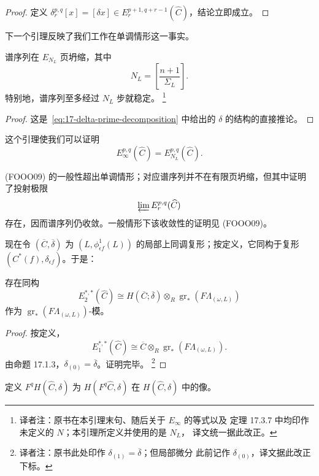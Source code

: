 \begin{proof}
定义 $\delta_r^{p,q}[x]=[\delta x]\in E_r^{p+1,q+r-1}(\widehat C)$，结论立即成立。
\end{proof}

下一个引理反映了我们工作在单调情形这一事实。

\begin{lemma}
\label{lem:spectral-sequence-collapse}
谱序列在 $E_{N_L}$ 页坍缩，其中
\[
 N_L=\left[\frac{n+1}{\Sigma_L}\right].
\]
特别地，谱序列至多经过 $N_L$ 步就稳定。
\footnote{译者注：原书在本引理末句、随后关于 $E_\infty$ 的等式以及
定理 17.3.7 中均印作未定义的 $N$；本引理所定义并使用的是 $N_L$，
译文统一据此改正。}
\end{lemma}

\begin{proof}
这是~\eqref{eq:17-delta-prime-decomposition} 中给出的 $\delta$ 的结构的直接推论。
\end{proof}

这个引理使我们可以证明
\[
 E_\infty^{p,q}(\widehat C)=E_{N_L}^{p,q}(\widehat C).
\]

\begin{remark}
\label{rem:nonmonotone-projective-limit}
(FOOO09) 的一般性超出单调情形；对应谱序列并不在有限页坍缩，但其中证明了投射极限
\[
 \varprojlim E_r^{p,q}(\widehat C)
\]
存在，因而谱序列仍收敛。一般情形下该收敛性的证明见 (FOOO09)。
\end{remark}

现在令 $(\overline C,\overline\delta)$ 为 $(L,\phi_{\epsilon f}^1(L))$ 的局部\personFloer{}上同调复形；按定义，它同构于\personMorse{}复形 $(C^*(f),\delta_{\epsilon f})$。于是：

\begin{lemma}
\label{lem:E2-local-floer-morse}
存在同构
\[
 E_2^{*,*}(\widehat C)\cong
 H(\overline C;\overline\delta)\otimes_R
 \operatorname{gr}_*(F\Lambda_{(\omega,L)})
\]
作为 $\operatorname{gr}_*(F\Lambda_{(\omega,L)})$-模。
\end{lemma}

\begin{proof}
按定义，
\[
 E_1^{*,*}(\widehat C)\cong
 \overline C\otimes_R\operatorname{gr}_*(F\Lambda_{(\omega,L)}).
\]
由命题 17.1.3，$\delta_{(0)}=\overline\delta$。证明完毕。
\footnote{译者注：原书此处印作 $\delta_{(1)}=\overline\delta$；但局部\personFloer{}微分
此前记作 $\delta_{(0)}$，译文据此改正下标。}
\end{proof}

\begin{definition}
\label{def:filtration-on-homology}
定义 $F^qH(\widehat C,\delta)$ 为
$H(F^q\widehat C,\delta)$ 在 $H(\widehat C,\delta)$ 中的像。
\end{definition}

